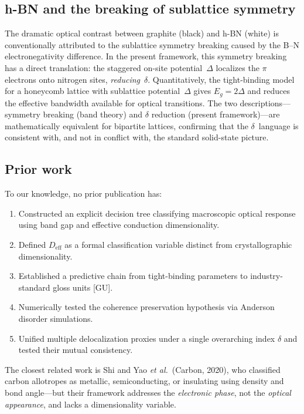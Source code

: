 \documentclass[twocolumn,showpacs,preprintnumbers,amsmath,amssymb,prb]{revtex4-2}
\begin{document}
\subsection{h-BN and the breaking of sublattice symmetry}
\label{sec:hBN_discussion}

The dramatic optical contrast between graphite (black) and h-BN (white)
is conventionally attributed to the sublattice symmetry breaking caused
by the B--N electronegativity difference. In the present framework, this
symmetry breaking has a direct translation: the staggered on-site
potential~$\Delta$ localizes the $\pi$ electrons onto nitrogen sites,
\emph{reducing}~$\delta$. Quantitatively, the tight-binding model for a
honeycomb lattice with sublattice potential~$\Delta$ gives
$E_g = 2\Delta$ and reduces the effective bandwidth available for
optical transitions. The two descriptions---symmetry breaking (band
theory) and $\delta$ reduction (present framework)---are mathematically
equivalent for bipartite lattices, confirming that the $\delta$~language
is consistent with, and not in conflict with, the standard solid-state
picture.

\subsection{Prior work}

To our knowledge, no prior publication has:
\begin{enumerate}
  \item Constructed an explicit decision tree classifying macroscopic
    optical response using band gap and effective conduction
    dimensionality.
  \item Defined $D_\mathrm{eff}$ as a formal classification variable
    distinct from crystallographic dimensionality.
  \item Established a predictive chain from tight-binding parameters
    to industry-standard gloss units [GU].
  \item Numerically tested the coherence preservation hypothesis via
    Anderson disorder simulations.
  \item Unified multiple delocalization proxies under a single
    overarching index $\delta$ and tested their mutual consistency.
\end{enumerate}

The closest related work is Shi and Yao \textit{et al.}\ (Carbon, 2020),
who classified carbon allotropes as metallic, semiconducting, or
insulating using density and bond angle---but their framework addresses
the \emph{electronic phase}, not the \emph{optical appearance}, and
lacks a dimensionality variable.
\end{document}
